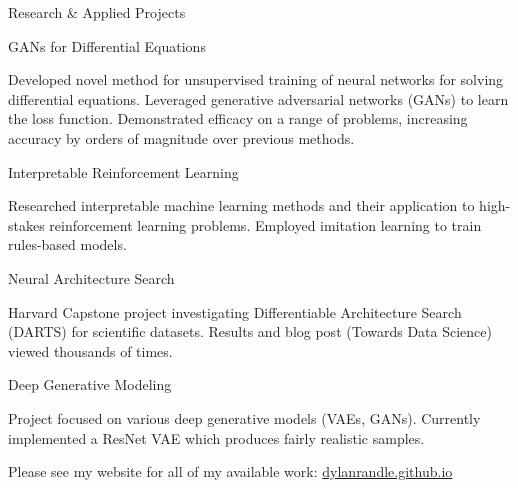 \documentclass{resume} %
\begin{document}
\begin{rSection}{Research \& Applied Projects}

\begin{rSubsection}{GANs for Differential Equations}{}{}{}

\item Developed novel method for unsupervised training of neural networks for solving differential equations. Leveraged generative adversarial networks (GANs) to learn the loss function. Demonstrated efficacy on a range of problems, increasing accuracy by orders of magnitude over previous methods.

\end{rSubsection}

\begin{rSubsection}{Interpretable Reinforcement Learning}{}{}{}

\item Researched interpretable machine learning methods and their application to high-stakes reinforcement learning problems. Employed imitation learning to train rules-based models. 

\end{rSubsection}

\begin{rSubsection}{Neural Architecture Search}{}{}{}
\item Harvard Capstone project investigating Differentiable Architecture Search (DARTS) for scientific datasets. Results and blog post (Towards Data Science) viewed thousands of times.
\end{rSubsection}

\begin{rSubsection}{Deep Generative Modeling}{}{}{}
\item Project focused on various deep generative models (VAEs, GANs). Currently implemented a ResNet VAE which produces fairly realistic samples.
\end{rSubsection}

Please see my website for all of my available work: \url{dylanrandle.github.io}

\end{rSection}

\end{document}
